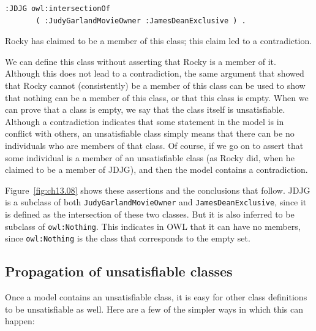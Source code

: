 \begin{lstlisting}
:JDJG owl:intersectionOf
       ( :JudyGarlandMovieOwner :JamesDeanExclusive ) .
\end{lstlisting}

Rocky has claimed to be a member of this class; this claim led to a
contradiction.

We can define this class without asserting that Rocky is a member of it.
Although this does not lead to a contradiction, the same argument that
showed that Rocky cannot (consistently) be a member of this class can be
used to show that nothing can be a member of this class, or that this
class is empty. When we can prove that a class is empty, we say that the
class itself is unsatisfiable. Although a contradiction indicates that
some statement in the model is in conflict with others, an unsatisfiable
class simply means that there can be no individuals who are members of
that class. Of course, if we go on to assert that some individual is a
member of an unsatisfiable class (as Rocky did, when he claimed to be a
member of JDJG), and then the model contains a contradiction.

Figure~\ref{fig:ch13.08} shows these assertions and the conclusions that follow. JDJG
is a subclass of both
\texttt{JudyGarlandMovieOwner} and \texttt{JamesDeanExclusive}, since it is defined as the
intersection of these two classes. But it is also inferred to be
subclass of \texttt{owl:Nothing}. This indicates in OWL that it can have no
members, since \texttt{owl:Nothing} is the class that corresponds to the empty
set.

\subsection{Propagation of unsatisfiable classes}

Once a model contains an unsatisfiable class, it is easy for other class
definitions to be unsatisfiable as well. Here are a few of the simpler
ways in which this can happen:

